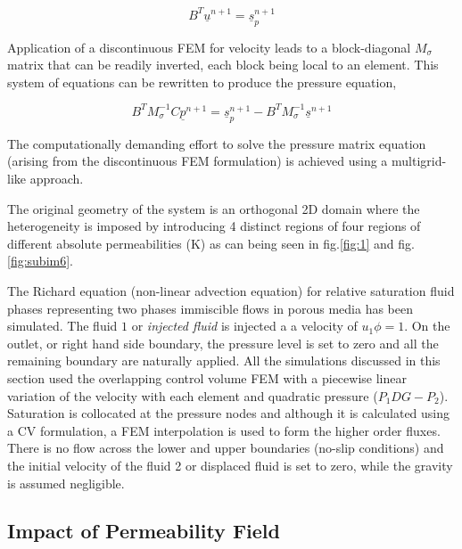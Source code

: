 \documentclass[preprint,authoryear,12pt]{elsarticle}
\begin{document}
\begin{equation}
B^T {{\underline{u}}^{n+1}} = {\underline{s}_p ^{n+1}}
\label{force balance eq}
\end{equation}

\noindent Application of a discontinuous FEM for velocity leads to a block-diagonal $M_{\sigma}$ matrix that can be readily inverted, each block being local to an element. This system of equations can be rewritten to produce the pressure equation, 

\begin{equation}
B^T M_{\sigma} ^{-1} C{{\underline{p}}^{n+1}} = {\underline{s}_p ^{n+1}} - B^T M_{\sigma} ^{-1} {{\underline{s}}^{n+1}} 
\label{pressure eq}
\end{equation}

The computationally demanding effort to solve the pressure matrix equation (arising from the discontinuous FEM formulation) is achieved using a multigrid-like approach. 

The original geometry of the system is an orthogonal 2D domain where the  heterogeneity is imposed by introducing 4 distinct regions of four regions of different absolute permeabilities (K) as can being seen in fig.\ref{fig:1} and fig. \ref{fig:subim6}.   

The Richard equation (non-linear advection equation) for relative saturation fluid phases representing two phases immiscible flows in porous media has been simulated. The fluid $1$ or \textit{injected fluid} is injected a a velocity of $u_1 \phi = 1$. On the outlet, or right hand side boundary, the pressure level is set to zero and all the remaining boundary are naturally applied. All the simulations discussed in this section used the overlapping control volume FEM with a piecewise linear variation of the velocity with each element and quadratic pressure ($P_1 DG-P_2$). Saturation is collocated at the  pressure nodes and although it is calculated using a CV formulation, a FEM interpolation is used to form the higher order fluxes. There is no flow across the lower and upper boundaries (no-slip conditions) and the initial velocity of the fluid 2 or displaced fluid is set to zero, while the gravity is assumed negligible.   

\subsection{Impact of Permeability Field}\label{section:PermeabilityAnalysis}
\end{document}

